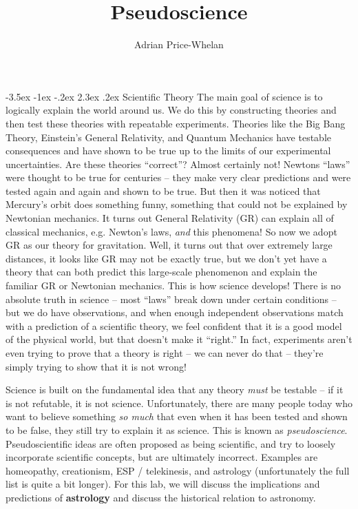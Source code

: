 \documentclass[12pt]{article}
\makeatletter
\renewcommand\section{\@startsection{section}{1}{\z@}%
                                  {-3.5ex \@plus -1ex \@minus -.2ex}%
                                  {2.3ex \@plus.2ex}%
                                  {\normalfont\large\bfseries}}
\makeatother
\begin{document}
\title{Pseudoscience}
\author{Adrian Price-Whelan}
\date{}%

\maketitle

\section{Scientific Theory}
The main goal of science is to logically explain the world around us. We do this by constructing theories and then test these theories with repeatable experiments. Theories like the Big Bang Theory, Einstein's General Relativity, and Quantum Mechanics have testable consequences and have shown to be true up to the limits of our experimental uncertainties. Are these theories ``correct''? Almost certainly not! Newtons ``laws'' were thought to be true for centuries -- they make very clear predictions and were tested again and again and shown to be true. But then it was noticed that Mercury's orbit does something funny, something that could not be explained by Newtonian mechanics. It turns out General Relativity (GR) can explain all of classical mechanics, e.g. Newton's laws, \emph{and} this phenomena! So now we adopt GR as our theory for gravitation. Well, it turns out that over extremely large distances, it looks like GR may not be exactly true, but we don't yet have a theory that can both predict this large-scale phenomenon and explain the familiar GR or Newtonian mechanics. This is how science develops! There is no absolute truth in science -- most ``laws'' break down under certain conditions -- but we do have observations, and when enough independent observations match with a prediction of a scientific theory, we feel confident that it is a good model of the physical world, but that doesn't make it ``right.'' In fact, experiments aren't even trying to prove that a theory is right -- we can never do that -- they're simply trying to show that it is not wrong!

Science is built on the fundamental idea that any theory \emph{must} be testable -- if it is not refutable, it is not science. Unfortunately, there are many people today who want to believe something \emph{so much} that even when it has been tested and shown to be false, they still try to explain it as science. This is known as \emph{pseudoscience}. Pseudoscientific ideas are often proposed as being scientific, and try to loosely incorporate scientific concepts, but are ultimately incorrect. Examples are homeopathy, creationism, ESP / telekinesis, and astrology (unfortunately the full list is quite a bit longer). For this lab, we will discuss the implications and predictions of  \textbf{astrology} and discuss the historical relation to astronomy.
\end{document}
